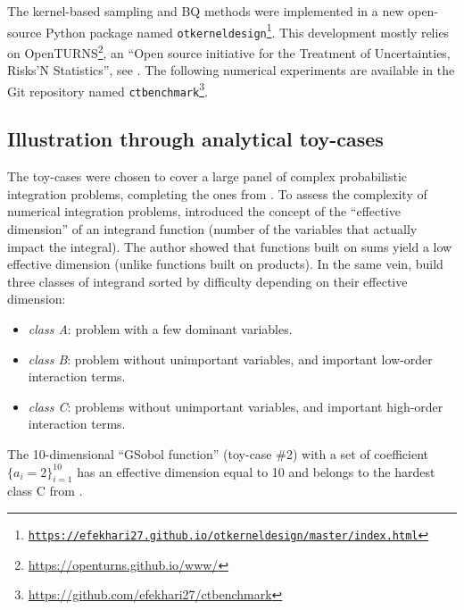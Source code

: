 The kernel-based sampling and BQ methods were implemented in a new open-source Python package named \texttt{otkerneldesign\footnote{\url{https://efekhari27.github.io/otkerneldesign/master/index.html}}}. 
This development mostly relies on OpenTURNS\footnote{\url{https://openturns.github.io/www/}}, an ``Open source initiative for the Treatment of Uncertainties, Risks'N Statistics'', see \cite{baudin_dutfoy_2017}. 
The following numerical experiments are available in the Git repository named \texttt{ctbenchmark}\footnote{ \url{https://github.com/efekhari27/ctbenchmark}}. 


\subsection{Illustration through analytical toy-cases}
The toy-cases were chosen to cover a large panel of complex probabilistic integration problems, completing the ones from \cite{fekhari_renew_2021}.
To assess the complexity of numerical integration problems, \cite{owen_2003} introduced the concept of the ``effective dimension'' of an integrand function (number of the variables that actually impact the integral). 
The author showed that functions built on sums yield a low effective dimension (unlike functions built on products). 
In the same vein, \cite{kucherenko_feil_2011} build three classes of integrand sorted by difficulty depending on their effective dimension: \begin{itemize}
    \item \emph{class A}: problem with a few dominant variables.
    \item \emph{class B}: problem without unimportant variables, and important low-order interaction terms.
    \item \emph{class C}: problems without unimportant variables, and important high-order interaction terms. 
\end{itemize}
The 10-dimensional ``GSobol function'' (toy-case \#2) with a set of coefficient $\{a_i=2\}_{i=1}^{10}$ has an effective dimension equal to 10 and belongs to the hardest class C from \cite{kucherenko_feil_2011}. 
